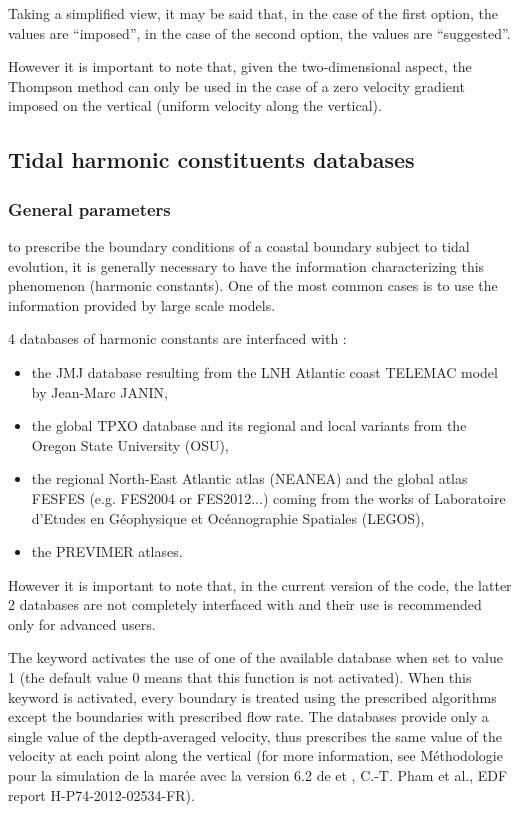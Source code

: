 Taking a simplified view, it may be said that, in the case of the first
option, the values are ``imposed'', in the case of the second option, the
values are ``suggested''.

However it is important to note that, given the two-dimensional aspect, the
Thompson method can only be used in the case of a zero velocity gradient
imposed on the vertical (uniform velocity along the vertical).


\subsection{Tidal harmonic constituents databases}


\subsubsection{General parameters}

to prescribe the boundary conditions of a coastal boundary subject to tidal
evolution, it is generally necessary to have the information characterizing
this phenomenon (harmonic constants). One of the most common cases is to use
the information provided by large scale models.

4 databases of harmonic constants are interfaced with :

\begin{itemize}
\item the JMJ database resulting from the LNH Atlantic coast TELEMAC model
by Jean-Marc JANIN,

\item the global TPXO database and its regional and local variants from
the Oregon State University (OSU),

\item the regional North-East Atlantic atlas (NEANEA) and the global atlas
FESFES (e.g. FES2004 or FES2012...) coming from the works of Laboratoire
d'Etudes en Géophysique et Océanographie Spatiales (LEGOS),

\item the PREVIMER atlases.
\end{itemize}

However it is important to note that, in the current version of the code, the
latter 2 databases are not completely interfaced with  and their use
is recommended only for advanced users.

The keyword  activates the use of
one of the available database when set to value 1 (the default value 0 means
that this function is not activated).  When this keyword is activated, every
boundary is treated using the prescribed algorithms except the boundaries with
prescribed flow rate. The databases provide only a single value of the
depth-averaged velocity, thus  prescribes the same value of the
velocity at each point along the vertical (for more information, see
Méthodologie pour la simulation de la marée avec la version 6.2 de 
et , C.-T. Pham et al., EDF report H-P74-2012-02534-FR).

